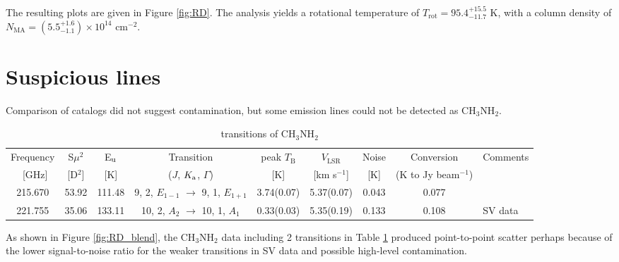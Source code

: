 The resulting plots are given in Figure \ref{fig:RD}.
The analysis yields a rotational temperature of $T_{\mathrm{rot}} =  95.4^{+15.5}_{-11.7} \,\,\mathrm{K}$, 
with a column density of $N_{\mathrm{MA}} = ( 5.5^{+1.6}_{-1.1} ) \times 10^{14} \,\,\mathrm{cm^{-2}}$.

\section{Suspicious lines}
Comparison of catalogs did not suggest contamination, but some emission lines could not be detected as CH$_{3}$NH$_{2}$.

\renewcommand{\arraystretch}{1.5}
\begin{table}[htb]
\begin{center}

  \caption{transitions of CH$_3$NH$_2$}
  \label{tab:unresolved}
{\scriptsize
  \begin{tabular}{ccccccccl} \hline
   Frequency & S$\mu ^{2}$ & E$_{\rm{u}}$& Transition & peak $T_{\mathrm{B}}$\footnotemark[1] & $V_{\mathrm{LSR}}$\footnotemark[1]  & Noise & Conversion  & Comments \\ 
  $\,$ [GHz]  & [D$^2$] &  [K] & ($J$, $K_{\rm{a}}$, $\Gamma$)  & [K] & [km s$^{-1}$] & [K] &  (K to Jy beam$^{-1}$) &  \\ \hline 
    215.670 & 53.92 & 111.48 & 9, 2, $E_{1-1}$ $\rightarrow$ 9, 1, $E_{1+1}$  & 3.74(0.07) & 5.37(0.07) & 0.043 & 0.077 &  \\
    221.755 & 35.06 & 133.11 & 10, 2, $A_{2}$ $\rightarrow$ 10, 1, $A_{1}$ & 0.33(0.03)& 5.35(0.19) & 0.133 &0.108 &SV data \\ \hline
  \end{tabular}
  }
\end{center}
\end{table}


As shown in Figure \ref{fig:RD_blend}, the CH$_{3}$NH$_{2}$ data including 2 transitions in Table \ref{tab:unresolved} 
produced point-to-point scatter perhaps because of the lower signal-to-noise ratio for the weaker transitions in SV data 
and possible high-level contamination.

